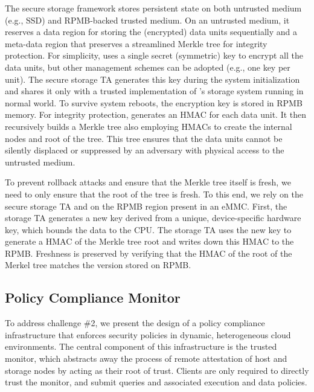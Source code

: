The secure storage framework stores persistent state on both untrusted medium (e.g., SSD) and RPMB-backed trusted medium. On an untrusted medium, it reserves a data region for storing the (encrypted) data units sequentially and a meta-data region that preserves a streamlined Merkle tree for integrity protection. For simplicity, \project uses a single secret (symmetric) key to encrypt all the data units, but other management schemes can be adopted (e.g., one key per unit). The secure storage TA generates this key during the system initialization and shares it only with a trusted implementation of \project's storage system running in normal world. To survive system reboots, the encryption key is stored in RPMB memory. For integrity protection, \project %
generates an HMAC for each data unit. It then recursively builds a Merkle tree also employing HMACs to create the internal nodes and root of the tree. This tree ensures that the data units cannot be silently displaced or suppressed by an adversary with physical access to the untrusted medium.

To prevent rollback attacks and ensure that the Merkle tree itself is fresh, we need to only ensure that the root of the tree is fresh. To this end, we rely on the secure storage TA and on the RPMB region present in an eMMC. First, the storage TA generates a new key derived from a unique, device-specific hardware key, which bounds the data to the CPU. The storage TA uses the new key to generate a HMAC of the Merkle tree root and writes down this HMAC to the RPMB. Freshness is preserved by verifying that the HMAC of the root of the Merkel tree matches the version stored on RPMB. %

\subsection{Policy Compliance Monitor}
\label{subsec:design-trusted-monitor}



To address challenge \#2, we present the design of a policy compliance infrastructure that enforces security policies in dynamic, heterogeneous cloud environments. The central component of this infrastructure is the trusted monitor, which abstracts away the process of remote attestation of host and storage nodes by acting as their root of trust. Clients are only required to directly trust the monitor, and submit queries and associated execution and data policies.

